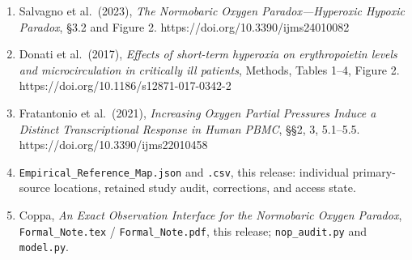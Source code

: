\documentclass[11pt]{article}
\providecommand{\tightlist}{\setlength{\itemsep}{0pt}\setlength{\parskip}{0pt}}
\begin{document}
\begin{enumerate}
\def\labelenumi{\arabic{enumi}.}
\tightlist
\item
  Salvagno et al.~(2023), \emph{The Normobaric Oxygen
  Paradox---Hyperoxic Hypoxic Paradox}, §3.2 and Figure 2.
  https://doi.org/10.3390/ijms24010082
\item
  Donati et al.~(2017), \emph{Effects of short-term hyperoxia on
  erythropoietin levels and microcirculation in critically ill
  patients}, Methods, Tables 1--4, Figure 2.
  https://doi.org/10.1186/s12871-017-0342-2
\item
  Fratantonio et al.~(2021), \emph{Increasing Oxygen Partial Pressures
  Induce a Distinct Transcriptional Response in Human PBMC}, §§2, 3,
  5.1--5.5. https://doi.org/10.3390/ijms22010458
\item
  \texttt{Empirical\_Reference\_Map.json} and \texttt{.csv}, this
  release: individual primary-source locations, retained study audit,
  corrections, and access state.
\item
  Coppa, \emph{An Exact Observation Interface for the Normobaric Oxygen
  Paradox}, \texttt{Formal\_Note.tex} / \texttt{Formal\_Note.pdf}, this
  release; \texttt{nop\_audit.py} and \texttt{model.py}.
\end{enumerate}
\end{document}
